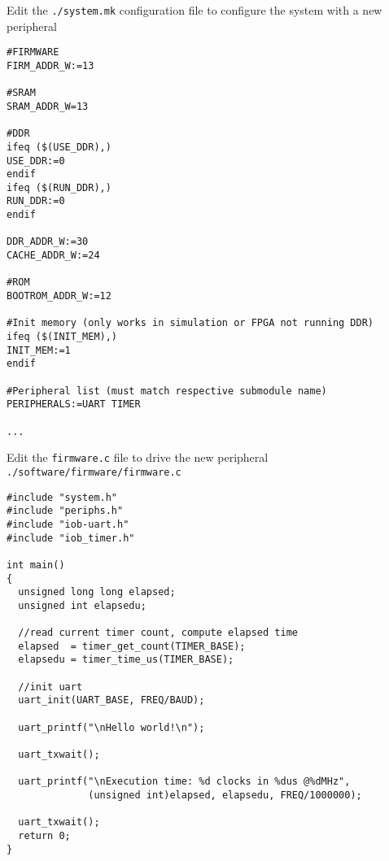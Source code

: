 \documentclass [xcolor=svgnames, t] {beamer}
\begin{document}
\begin{frame}[fragile]{Edit the {\tt ./system.mk} configuration file to configure the system with a new peripheral}
\begin{tiny}
\begin{lstlisting}
#FIRMWARE
FIRM_ADDR_W:=13

#SRAM
SRAM_ADDR_W=13

#DDR
ifeq ($(USE_DDR),)
USE_DDR:=0
endif
ifeq ($(RUN_DDR),)
RUN_DDR:=0
endif

DDR_ADDR_W:=30
CACHE_ADDR_W:=24

#ROM
BOOTROM_ADDR_W:=12

#Init memory (only works in simulation or FPGA not running DDR)
ifeq ($(INIT_MEM),)
INIT_MEM:=1
endif

#Peripheral list (must match respective submodule name)
PERIPHERALS:=UART TIMER

...
\end{lstlisting}
\end{tiny}
\end{frame}



\begin{frame}[fragile]{Edit the {\tt firmware.c} file to drive the new peripheral}
  {\tt ./software/firmware/firmware.c}
  \begin{tiny}
    \begin{lstlisting}
#include "system.h"
#include "periphs.h"
#include "iob-uart.h"
#include "iob_timer.h"

int main()
{
  unsigned long long elapsed;
  unsigned int elapsedu;

  //read current timer count, compute elapsed time
  elapsed  = timer_get_count(TIMER_BASE);
  elapsedu = timer_time_us(TIMER_BASE);

  //init uart 
  uart_init(UART_BASE, FREQ/BAUD);

  uart_printf("\nHello world!\n");
  
  uart_txwait();

  uart_printf("\nExecution time: %d clocks in %dus @%dMHz", 
              (unsigned int)elapsed, elapsedu, FREQ/1000000);

  uart_txwait();
  return 0;
}
\end{lstlisting}
\end{tiny}
\end{frame}
\end{document}
